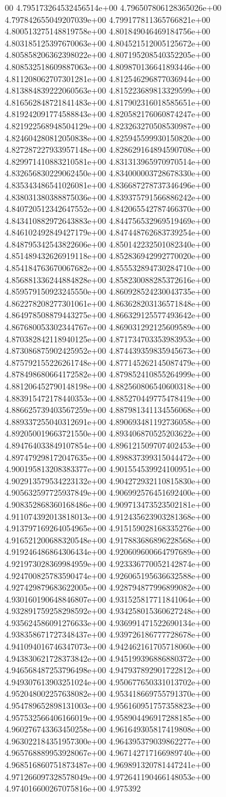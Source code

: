 00	4.795173264532456514e+00	4.796507806128365026e+00	4.797842655049207039e+00	4.799177811365766821e+00	4.800513275148819758e+00	4.801849046469184756e+00	4.803185125397670063e+00	4.804521512005125672e+00	4.805858206362398022e+00	4.807195208540352205e+00	4.808532518609887063e+00	4.809870136641893446e+00	4.811208062707301281e+00	4.812546296877036944e+00	4.813884839222060563e+00	4.815223689813329599e+00	4.816562848721841483e+00	4.817902316018585651e+00	4.819242091774588843e+00	4.820582176060874247e+00	4.821922568948504129e+00	4.823263270508530987e+00	4.824604280812050838e+00	4.825945599930150820e+00	4.827287227933957148e+00	4.828629164894590708e+00	4.829971410883210581e+00	4.831313965970970514e+00	4.832656830229062450e+00	4.834000003728678330e+00	4.835343486541026081e+00	4.836687278737346496e+00	4.838031380388875036e+00	4.839375791566886242e+00	4.840720512342647552e+00	4.842065542787466370e+00	4.843410882972643883e+00	4.844756532969519469e+00	4.846102492849427179e+00	4.847448762683739254e+00	4.848795342543822606e+00	4.850142232501082340e+00	4.851489432626919118e+00	4.852836942992770020e+00	4.854184763670067682e+00	4.855532894730284710e+00	4.856881336244884828e+00	4.858230088285372616e+00	4.859579150923245550e+00	4.860928524230043735e+00	4.862278208277301061e+00	4.863628203136571848e+00	4.864978508879443275e+00	4.866329125577493642e+00	4.867680053302344767e+00	4.869031292125609589e+00	4.870382842118940125e+00	4.871734703353983953e+00	4.873086875902425952e+00	4.874439359835945673e+00	4.875792155226261748e+00	4.877145262145087479e+00	4.878498680664172582e+00	4.879852410855264999e+00	4.881206452790148198e+00	4.882560806540600318e+00	4.883915472178440353e+00	4.885270449775478419e+00	4.886625739403567259e+00	4.887981341134556068e+00	4.889337255040312691e+00	4.890693481192736058e+00	4.892050019663721550e+00	4.893406870525203622e+00	4.894764033849107854e+00	4.896121509707402453e+00	4.897479298172047635e+00	4.898837399315044472e+00	4.900195813208383377e+00	4.901554539924100951e+00	4.902913579534223132e+00	4.904272932110815830e+00	4.905632597725937849e+00	4.906992576451692400e+00	4.908352868360168486e+00	4.909713473523502181e+00	4.911074392013818013e+00	4.912435623903281368e+00	4.913797169264054965e+00	4.915159028168335276e+00	4.916521200688320548e+00	4.917883686896228568e+00	4.919246486864306434e+00	4.920609600664797689e+00	4.921973028369984959e+00	4.923336770052142874e+00	4.924700825783590474e+00	4.926065195636632588e+00	4.927429879683622005e+00	4.928794877996899082e+00	4.930160190648846807e+00	4.931525817711841064e+00	4.932891759258298592e+00	4.934258015360627248e+00	4.935624586091276633e+00	4.936991471522690134e+00	4.938358671727348437e+00	4.939726186777728678e+00	4.941094016746347073e+00	4.942462161705718060e+00	4.943830621728373842e+00	4.945199396886880372e+00	4.946568487253796498e+00	4.947937892901722812e+00	4.949307613903251024e+00	4.950677650331013702e+00	4.952048002257638082e+00	4.953418669755791370e+00	4.954789652898131003e+00	4.956160951757358823e+00	4.957532566406166019e+00	4.958904496917288185e+00	4.960276743363450258e+00	4.961649305817419808e+00	4.963022184351957300e+00	4.964395379039862277e+00	4.965768889953928067e+00	4.967142717166989740e+00	4.968516860751873487e+00	4.969891320781447241e+00	4.971266097328578049e+00	4.972641190466148053e+00	4.974016600267075816e+00	4.975392